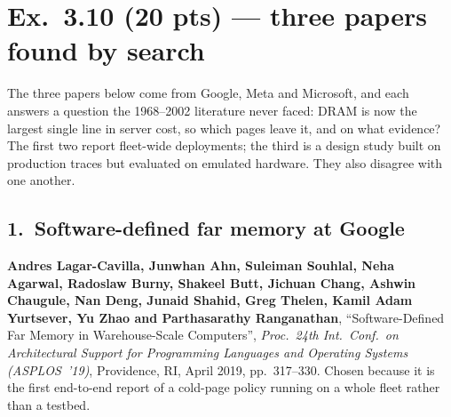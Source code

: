 \section*{Ex.~3.10 \quad (20 pts) --- three papers found by search}

The three papers below come from Google, Meta and Microsoft, and each answers a question
the 1968--2002 literature never faced: DRAM is now the largest single line in server
cost, so which pages leave it, and on what evidence? The first two report fleet-wide deployments;
the third is a design study built on production traces but evaluated on emulated
hardware. They also disagree with one another.

\subsection*{1.~Software-defined far memory at Google}

\noindent\textbf{Andres Lagar-Cavilla, Junwhan Ahn, Suleiman Souhlal, Neha Agarwal,
Radoslaw Burny, Shakeel Butt, Jichuan Chang, Ashwin Chaugule, Nan Deng, Junaid Shahid,
Greg Thelen, Kamil Adam Yurtsever, Yu Zhao and Parthasarathy Ranganathan},
``Software-Defined Far Memory in Warehouse-Scale Computers'', \emph{Proc.\ 24th Int.\
Conf.\ on Architectural Support for Programming Languages and Operating Systems
(ASPLOS~'19)}, Providence, RI, April 2019, pp.~317--330. Chosen because it is the first
end-to-end report of a cold-page policy running on a whole fleet rather than a testbed.

